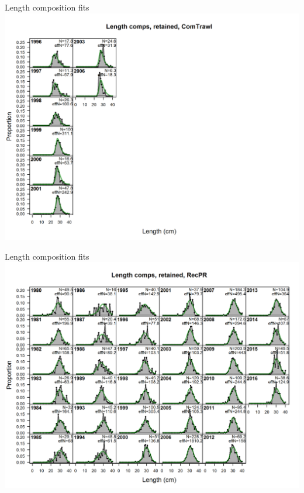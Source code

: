 \documentclass[ignorenonframetext,]{beamer}
\begin{document}
\begin{frame}{Length composition fits}\includegraphics{./r4ss/plots_mod1/comp_lenfit_flt3mkt2.png}\end{frame}

\begin{frame}{Length composition fits}\includegraphics{./r4ss/plots_mod1/comp_lenfit_flt4mkt2.png}\end{frame}
\end{document}
